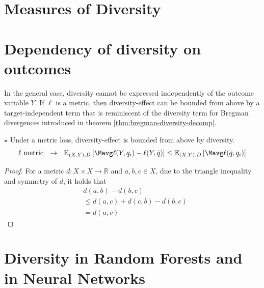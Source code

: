 \documentclass[
    a4paper, %
	fontsize=10pt, %
	twoside=false, %
]{kaobook}
\begin{document}
\section{Measures of Diversity}
\label{sec:diversity-measures}








\section{Dependency of diversity on outcomes}


In the general case, diversity cannot be expressed independently of the outcome variable $Y$. If $\ell$ is a metric, then diversity-effect can be bounded from above by a target-independent term that is reminiscent of the diversity term for Bregman divergences introduced in theorem \ref{thm:bregman-diversity-decomp}.
\begin{lemma} $\star$ Under a metric loss, diversity-effect is bounded from above by diversity. 
$$
\text{$\ell$ metric}  ~~\rightarrow~~ \mathbb{E}_{(X,Y), D}\left[ \Mavg \ell(Y, q_{i}) - \ell(Y, \bar{q}) \right] 
\leq \mathbb{E}_{(X,Y),D}\left[ \Mavg \ell(\bar{q}, q_{i}) \right] 
$$
\end{lemma}
\begin{proof}
For a metric $d:X \times X \to \mathbb{R}$ and $a,b,c \in X$, due to the triangle inequality and symmetry of $d$, it holds that
\begin{align*}
& d(a,b) - d(b,c)  \\
& \leq d(a,c) + d(c,b) - d(b,c) \\
&= d(a,c)
\end{align*}
\end{proof}



\section{Diversity in Random Forests and in Neural Networks}
\end{document}
